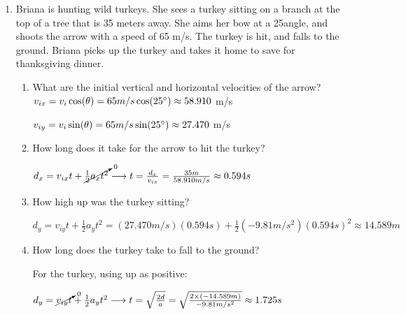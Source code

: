 \documentclass[letterpaper, 12pt]{article}
\begin{document}
\begin{enumerate}
\item Briana is hunting wild turkeys.  She sees a turkey sitting on a branch at the top of a tree that is 35 meters away.  She aims her bow at a 25\degree angle, and shoots the arrow with a speed of 65 m/s.  The turkey is hit, and falls to the ground.  Briana picks up the turkey and takes it home to save for thanksgiving dinner.

\begin{enumerate}
	\item What are the initial vertical and horizontal velocities of the arrow?
		\vspace{0.1in}
	\color{red}
	$ v_{ix} = v_i \cos (\theta) = 65 m/s \cos (25 \degree )  \approx  58.910$  m/s

	$ v_{iy} = v_i \sin (\theta) = 65 m/s \sin (25 \degree )  \approx 27.470$  m/s
	\color{black}

	\vspace{0.1in}
	\item How long does it take for the arrow to hit the turkey?
	
		\color{red}
	$d_x = v_{ix}t + \cancelto{0}{\frac{1}{2}a_xt^2} \longrightarrow t = \frac{d_x}{v_{ix}} = \frac{35 m}{58.910 m/s} \approx 0.594 s$
	\color{black}
	
	\vspace{0.1in}
	\item How high up was the turkey sitting?

	\vspace{0.1in}
\color{red}
	$d_y = v_{iy}t + \frac{1}{2}a_yt^2 = (27.470 m/s)(0.594 s) + \frac{1}{2}(-9.81 m/s^2)(0.594 s)^2 \approx 14.589 m $	
\color{black}

	\vspace{0.1in}
	\item{How long does the turkey take to fall to the ground?}
	
	\color{red}
		\vspace{0.1in}
	For the turkey, using up as positive:
	
	$d_y = \cancelto{0}{v_{iy}t} + \frac{1}{2}a_yt^2 \longrightarrow  t = \sqrt{\frac{2d}{a}} = \sqrt{\frac{2 \times (-14.589 m) }{-9.81 m/s^2}} \approx 1.725 s $ 
	\color{black}
	
\end{enumerate}


 
\end{enumerate}
\end{document}
